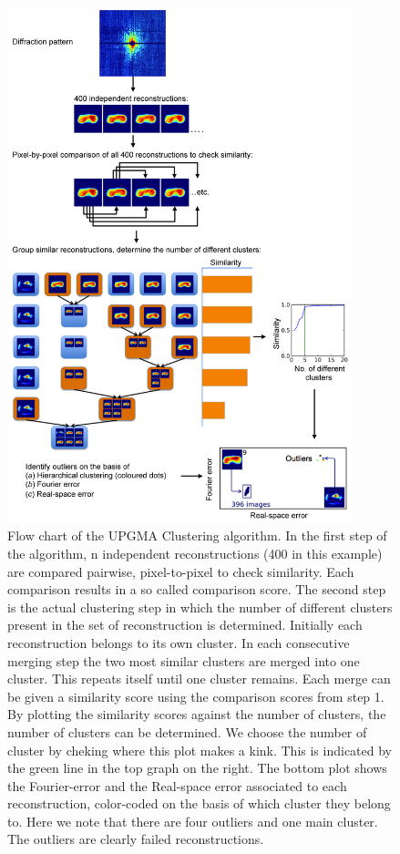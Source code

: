 \begin{figure}[h]
	\centering 
		\includegraphics[width=100mm]{Chapter_06_UPGMAClustering.jpg}
	\caption{Flow chart of the UPGMA Clustering algorithm. In the first step of the algorithm, n independent reconstructions (400 in this example) are compared pairwise, pixel-to-pixel to check similarity. Each comparison results in a so called comparison score. The second step is the actual clustering step in which the number of different clusters present in the set of reconstruction is determined. Initially each reconstruction belongs to its own cluster. In each consecutive merging step the two most similar clusters are merged into one cluster. This repeats itself until one cluster remains. Each merge can be given a similarity score using the comparison	scores from step 1. By plotting the similarity scores against the number of clusters, the number of clusters can be determined. We choose the number of cluster by cheking where this plot makes a kink. This is indicated by the green line in the top graph on the right. The bottom plot shows the Fourier-error and the Real-space error associated to each reconstruction, color-coded on the basis of which cluster they belong to. Here we note that there are four outliers and one main cluster. The outliers are clearly failed reconstructions.}
	\label{fig:UPGMA}
\end{figure}

